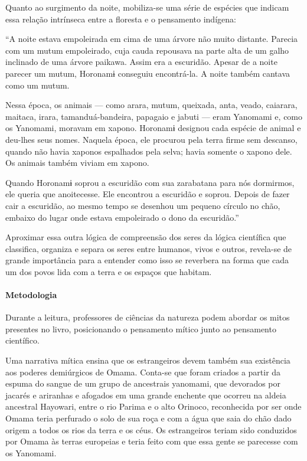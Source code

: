 \documentclass[12pt]{extarticle}
\begin{document}
Quanto ao surgimento da noite, mobiliza-se uma série de espécies que indicam essa 
relação intrínseca entre a floresta e o pensamento indígena: 

``A noite estava empoleirada em cima de uma árvore não muito distante. Parecia com 
um mutum empoleirado, cuja cauda repousava na parte alta de um galho inclinado de 
uma árvore paikawa. Assim era a escuridão. Apesar de a noite parecer um mutum, 
Horonamɨ conseguiu encontrá-la. A noite também cantava como um mutum.

Nessa época, os animais — como arara, mutum, queixada, anta, veado, caiarara, maitaca, 
irara, tamanduá-bandeira, papagaio e jabuti — eram Yanomami e, como os Yanomami, moravam 
em xapono. Horonamɨ designou cada espécie de animal e deu-lhes seus nomes. Naquela época, 
ele procurou pela terra firme sem descanso, quando não havia xaponos espalhados pela selva; 
havia somente o xapono dele. Os animais também viviam em xapono.

Quando Horonamɨ soprou a escuridão com sua zarabatana para nós dormirmos, ele queria que 
anoitecesse. Ele encontrou a escuridão e soprou. Depois de fazer cair a escuridão, ao mesmo 
tempo se desenhou um pequeno círculo no chão, embaixo do lugar onde estava empoleirado o 
dono da escuridão.''

Aproximar essa outra lógica de compreensão dos seres da lógica científica que classifica,
organiza e separa os seres entre humanos, vivos e outros, revela-se de grande importância
para a entender como isso se reverbera na forma que cada um dos povos lida com a terra e os 
espaços que habitam. 

\paragraph{Metodologia}

Durante a leitura, professores de ciências da natureza podem abordar os mitos 
presentes no livro, posicionando o pensamento mítico junto ao pensamento científico.

Uma narrativa mítica ensina que os estrangeiros devem também sua
existência aos poderes demiúrgicos de Omama. Conta-se que foram criados
a partir da espuma do sangue de um grupo de ancestrais yanomami, que devorados por jacarés 
e ariranhas e afogados em uma grande enchente que ocorreu na aldeia ancestral Hayowari, entre 
o rio Parima e o alto Orinoco, reconhecida por ser onde Omama teria perfurado o solo de sua 
roça e com a água que saia do chão dado origem a todos os rios da terra e os céus. Os estrangeiros 
teriam sido conduzidos por Omama às terras europeias e teria feito com que essa gente se parecesse
com os Yanomami.
\end{document}
